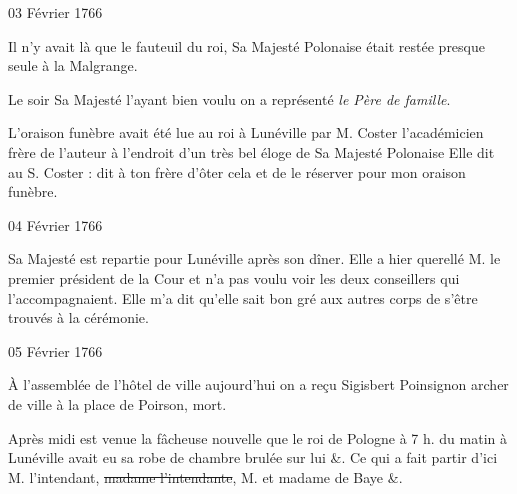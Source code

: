 \begin{diary}{03 Février 1766}{}
        
                         Il n'y avait là que le fauteuil du
                           roi,
                           Sa Majesté Polonaise était restée presque seule à
                           la Malgrange. \bigskip
        
        
                         Le soir Sa Majesté l'ayant bien voulu on a
                           représenté \emph{le Père de famille}. \bigskip
        
        
                         L'oraison funèbre avait été
                           lue au roi à
                           Lunéville par M. Coster l'académicien frère
                           de l'auteur à l'endroit d'un très bel éloge
                           de Sa Majesté Polonaise Elle dit au S.
                              Coster : \og dit à
                              ton frère d'ôter cela et de le réserver pour
                              mon oraison funèbre. \fg{}
                        \bigskip
        
        
                     \end{diary}

                     \begin{diary}{04 Février 1766}{}
                        
                        
                           Sa Majesté est repartie pour Lunéville après
                           son dîner. Elle a hier querellé M. le
                              premier
                              président de la Cour et n'a pas voulu voir les deux conseillers qui
                           l'accompagnaient.
                           Elle m'a dit qu'elle sait bon gré aux
                           autres corps de s'être trouvés à la cérémonie. \bigskip
        
        
                     \end{diary}

                     \begin{diary}{05 Février 1766}{}
                        
                         À l'assemblée de l'hôtel de ville aujourd'hui
                           on a reçu Sigisbert
                              Poinsignon archer de ville
                           à la place de Poirson, mort. \bigskip
        
        
                         Après midi est venue la fâcheuse
                           nouvelle
                           que le roi de Pologne à 7 h. du matin à Lunéville
                           avait eu sa robe de chambre brulée sur lui &.
                           Ce qui a fait partir d'ici M.
                              l'intendant, \sout{madame
                                 l'intendante}, M. et madame de Baye &. \bigskip
        
        
                     \end{diary}

